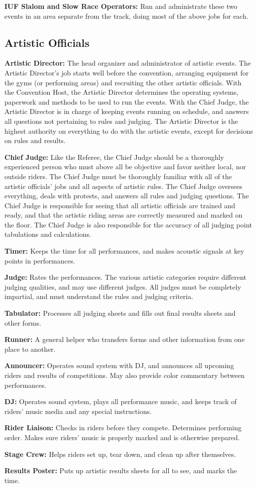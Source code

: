 \textbf{IUF Slalom and Slow Race Operators:} Run and administrate these two events in an area separate from the track, doing most of the above jobs for each.

\subsection{Artistic Officials}
\textbf{Artistic Director:} The head organizer and administrator of artistic events.
The Artistic Director's job starts well before the convention, arranging equipment for the gyms (or performing areas) and recruiting the other artistic officials.
With the Convention Host, the Artistic Director determines the operating systems, paperwork and methods to be used to run the events.
With the Chief Judge, the Artistic Director is in charge of keeping events running on schedule, and answers all questions not pertaining to rules and judging.
The Artistic Director is the highest authority on everything to do with the artistic events, except for decisions on rules and results.

\textbf{Chief Judge:} Like the Referee, the Chief Judge should be a thoroughly experienced person who must above all be objective and favor neither local, nor outside riders.
The Chief Judge must be thoroughly familiar with all of the artistic officials' jobs and all aspects of artistic rules.
The Chief Judge oversees everything, deals with protests, and answers all rules and judging questions.
The Chief Judge is responsible for seeing that all artistic officials are trained and ready, and that the artistic riding areas are correctly measured and marked on the floor.
The Chief Judge is also responsible for the accuracy of all judging point tabulations and calculations.

\textbf{Timer:} Keeps the time for all performances, and makes acoustic signals at key points in performances.

\textbf{Judge:} Rates the performances.
The various artistic categories require different judging qualities, and may use different judges.
All judges must be completely impartial, and must understand the rules and judging criteria.

\textbf{Tabulator:} Processes all judging sheets and fills out final results sheets and other forms.

\textbf{Runner:} A general helper who transfers forms and other information from one place to another.

\textbf{Announcer:} Operates sound system with DJ, and announces all upcoming riders and results of competitions.
May also provide color commentary between performances.

\textbf{DJ:} Operates sound system, plays all performance music, and keeps track of riders' music media and any special instructions.

\textbf{Rider Liaison:} Checks in riders before they compete.
Determines performing order.
Makes sure riders' music is properly marked and is otherwise prepared.

\textbf{Stage Crew:} Helps riders set up, tear down, and clean up after themselves.

\textbf{Results Poster:} Puts up artistic results sheets for all to see, and marks the time.
